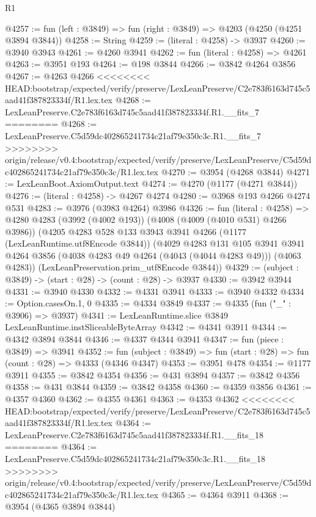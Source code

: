 \begin{lexlean}{R1}
\begin{coremodule}
{{{{{{{{{{{{{{{{{{{{{{{{{{{{{{{{{{{{{{{{{{{{{{{{{{{{{{{{{{{{{{{{{{{{{{{{{{{{{{{{{{{{{{{{{{{{{{{{{{{{{{{{{{{{{{{{{{{{{{{{{{{{{{{{{{{{{{{{{{{{{{{{{{{{{{{{{{{{{{{{{{{{{{{{{{{{{{{{{{{{{{{{{{@4257 := fun (left : @3849) => fun (right : @3849) => @4203 (@4250 (@4251 @3894 @3844))
@4258 := String
@4259 := (literal : @4258) -> @3937
@4260 := @3940 @3943
@4261 := @4260 @3941
@4262 := fun (literal : @4258) => @4261
@4263 := @3951 @193
@4264 := @198 @3844
@4266 := @3842 @4264 @3856
@4267 := @4263 @4266
<<<<<<<< HEAD:bootstrap/expected/verify/preserve/LexLeanPreserve/C2e783f6163d745c5aad41f387823334f/R1.lex.tex
@4268 := LexLeanPreserve.C2e783f6163d745c5aad41f387823334f.R1.__fits_7
========
@4268 := LexLeanPreserve.C5d59dc402865241734c21af79e350c3c.R1.__fits_7
>>>>>>>> origin/release/v0.4:bootstrap/expected/verify/preserve/LexLeanPreserve/C5d59dc402865241734c21af79e350c3c/R1.lex.tex
@4270 := @3954 (@4268 @3844)
@4271 := LexLeanBoot.AxiomOutput.text
@4274 := @4270 (@1177 (@4271 @3844))
@4276 := (literal : @4258) -> @4267 @4274
@4280 := @3968 @193 @4266 @4274 @531
@4283 := @3976 (@3983 @4264) @3986
@4326 := fun (literal : @4258) =>
  @4280
    @4283
    (@3992 (@4002 @193))
    (@4008 (@4009 (@4010 @531) @4266 @3986))
    (@4205
      @4283
      @528
      @133
      @3943
      @3941
      @4266
      (@1177 (LexLeanRuntime.utf8Encode @3844))
      (@4029
        @4283
        @131
        @105
        @3941
        @3941
        @4264
        @3856
        (@4038 @4283 @49 @4264 (@4043 (@4044 @4283 @49)))
        (@4063 @4283))
      (LexLeanPreservation.prim_utf8Encode @3844))
@4329 := (subject : @3849) -> (start : @28) -> (count : @28) -> @3937
@4330 := @3942 @3944
@4331 := @3940 @4330
@4332 := @4331 @3941
@4333 := @3940 @4332
@4334 := Option.casesOn.{1, 0}
@4335 := @4334 @3849
@4337 := @4335 (fun ("_" : @3906) => @3937)
@4341 := LexLeanRuntime.slice @3849 LexLeanRuntime.instSliceableByteArray
@4342 := @4341 @3911
@4344 := @4342 @3894 @3844
@4346 := @4337 @4344 @3941
@4347 := fun (piece : @3849) => @3941
@4352 := fun (subject : @3849) => fun (start : @28) => fun (count : @28) => @4333 (@4346 @4347)
@4353 := @3951 @478
@4354 := @1177 @3911
@4355 := @3842 @4354
@4356 := @431 @3894
@4357 := @3842 @4356
@4358 := @431 @3844
@4359 := @3842 @4358
@4360 := @4359 @3856
@4361 := @4357 @4360
@4362 := @4355 @4361
@4363 := @4353 @4362
<<<<<<<< HEAD:bootstrap/expected/verify/preserve/LexLeanPreserve/C2e783f6163d745c5aad41f387823334f/R1.lex.tex
@4364 := LexLeanPreserve.C2e783f6163d745c5aad41f387823334f.R1.__fits_18
========
@4364 := LexLeanPreserve.C5d59dc402865241734c21af79e350c3c.R1.__fits_18
>>>>>>>> origin/release/v0.4:bootstrap/expected/verify/preserve/LexLeanPreserve/C5d59dc402865241734c21af79e350c3c/R1.lex.tex
@4365 := @4364 @3911
@4368 := @3954 (@4365 @3894 @3844)
}}}}}}}}}}}}}}}}}}}}}}}}}}}}}}}}}}}}}}}}}}}}}}}}}}}}}}}}}}}}}}}}}}}}}}}}}}}}}}}}}}}}}}}}}}}}}}}}}}}}}}}}}}}}}}}}}}}}}}}}}}}}}}}}}}}}}}}}}}}}}}}}}}}}}}}}}}}}}}}}}}}}}}}}}}}}}}}}}}}}}}}}}}
\end{coremodule}
\end{lexlean}
